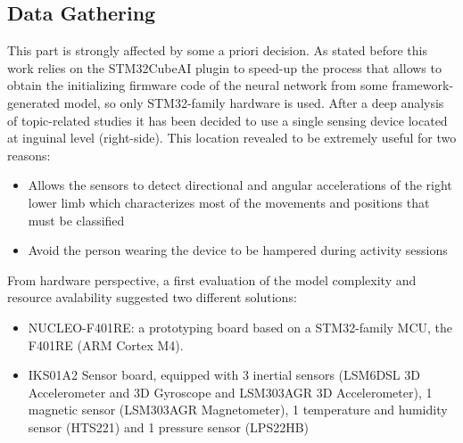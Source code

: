 \subsection{Data Gathering}
This part is strongly affected by some a priori decision. As stated before this work relies on the STM32CubeAI plugin to speed-up the process that allows to obtain the initializing firmware code of the neural network from some framework-generated model, so only STM32-family hardware is used. After a deep analysis of topic-related studies it has been decided to use a single sensing device located at inguinal level (right-side). This location revealed to be extremely useful for two reasons:
\begin{itemize}
	\item Allows the sensors to detect directional and angular accelerations of the right lower limb which characterizes most of the movements and positions that must be classified 
	\item Avoid the person wearing the device to be hampered during activity sessions
\end{itemize}
From hardware perspective, a first evaluation of the model complexity and resource avalability suggested two different solutions:
\begin{itemize}
	\item NUCLEO-F401RE: a prototyping board based on a STM32-family MCU, the F401RE (ARM Cortex M4).
	\item IKS01A2 Sensor board, equipped with 3 inertial sensors (LSM6DSL 3D Accelerometer and 3D Gyroscope and LSM303AGR 3D Accelerometer), 1 magnetic sensor (LSM303AGR Magnetometer), 1 temperature and humidity sensor (HTS221) and 1 pressure sensor (LPS22HB)
\end{itemize} 
